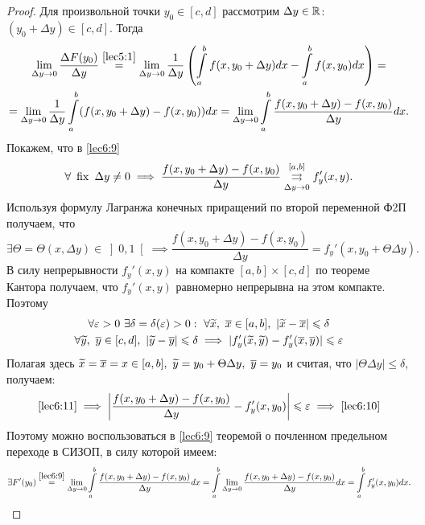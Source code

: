 \documentclass[../../main.tex]{subfiles}
\begin{document}
\begin{proof}
	Для произвольной точки $ y_0 \in [c, d] $ рассмотрим $ \Delta y \in \mathbb{R} $:
	$ (y_0 + \Delta y) \in [c, d] $. Тогда 
	\begin{equation}
	\begin{gathered}
		\lim\limits_{\Delta y \to 0} \dfrac{\Delta F(y_0)}{\Delta y} 
		\stackrel{\eqref{lec5:1}}{=} \lim\limits_{\Delta y \to 0}
		\dfrac{1}{\Delta y} \left(
		\int\limits_a^b f(x, y_0 + \Delta y) dx - \int\limits_a^b f(x, y_0) dx
		\right) = \\
		\label{lec6:9} =
		\lim\limits_{\Delta y \to 0} \dfrac{1}{\Delta y}
		\int\limits_a^b (f(x, y_0 + \Delta y) - f(x, y_0)) dx = 
		\lim\limits_{\Delta y \to 0}\int\limits_a^b
		\dfrac{f(x, y_0 + \Delta y) - f(x, y_0)}{\Delta y} dx.
	\end{gathered}
	\end{equation}
	Покажем, что в \eqref{lec6:9} 
	\begin{equation}
	\label{lec6:10} 
	\forall\ \operatorname{fix} \ \Delta y \neq 0 \implies
	\dfrac{f(x, y_0 + \Delta y) - f(x, y_0)}{\Delta y} 
	\stackrel{[a, b]}{\underset{\Delta y \to 0}{\rightrightarrows}} f_y'(x, y).
	\end{equation}
	Используя формулу Лагранжа конечных приращений по второй переменной 
	Ф2П получаем, что 
	\[ 
	\exists \Theta = \Theta(x, \Delta y) \in \left]0, 1\right[ 
	\implies \dfrac{f(x, y_0 + \Delta y) - f(x, y_0)}{\Delta y} = 
	f_y'(x, y_0 + \Theta\Delta y).
	\]
	В силу непрерывности $ f_y'(x, y) $ на компакте $ [a, b] \times 
	[c, d] $ по теореме Кантора получаем, что $ f_y'(x, y) $ равномерно
	непрерывна на этом компакте. Поэтому
	\begin{equation}
		\begin{gathered}
		\forall \eps > 0 \ \exists \delta = \delta(\eps) > 0: \ 
		\forall \widetilde{x},\ \overline{x} \in [a, b],\ 
		|\widetilde{x} - \overline{x}| \leq \delta \\
		\label{lec6:11}
		\forall \widetilde{y},\ \overline{y} \in [c, d],\
		|\widetilde{y} - \overline{y}| \leq \delta \implies
		|f_y'(\widetilde{x}, \widetilde{y}) - f_y'(\overline{x}, \overline{y})|
		\leq \eps
		\end{gathered}
	\end{equation}
	Полагая здесь $ \widetilde{x} = \overline{x} = x \in [a, b],\ 
	\widetilde{y} = y_0 + \Theta\D y, \ \overline{y} = y_0$ и считая, что 
	$ |\Theta\Delta y| \leq \delta $, получаем:
	\[
	\eqref{lec6:11} \implies\left|
	\dfrac{f(x, y_0 + \Delta y) - f(x, y_0)}{\Delta y} - f_y'(x, y_0)
	\right| \leqslant \varepsilon \implies \eqref{lec6:10}
	\]
	Поэтому можно воспользоваться в \eqref{lec6:9} теоремой о почленном 
	предельном переходе в СИЗОП, в силу которой имеем:
	\[
	\exists F'(y_0) \stackrel{\eqref{lec6:9}}{=} \lim\limits_{\Delta y \to 0}
	\int\limits_a^b \dfrac{f(x, y_0 + \Delta y) - f(x, y_0)}{\Delta y} dx =
	\int\limits_a^b \lim\limits_{\Delta y \to 0} 
	\dfrac{f(x, y_0 + \Delta y) - f(x, y_0)}{\Delta y} dx = 
	\int\limits_a^b f_y'(x, y_0) dx.
	\]
\end{proof}
\end{document}

